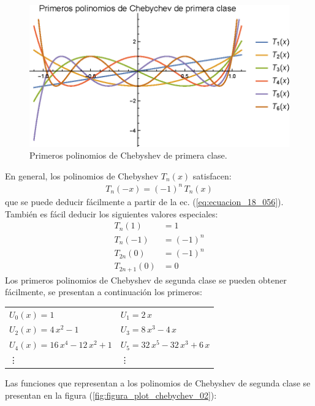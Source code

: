 \begin{figure}[H]
    \centering
    \includegraphics[scale=1.2]{Imagenes/Plot_Polinomios_Chebychev_01.eps}
    \caption{Primeros polinomios de Chebyshev de primera clase.}
    \label{fig:figura_plot_chebychev_01}
\end{figure}
En general, los polinomios de Chebyshev $T_{n}(x)$ satisfacen:
\begin{align*}
T_{n}(-x) = (-1)^{n} \, T_{n} (x)
\end{align*}
que se puede deducir fácilmente a partir de la ec. (\ref{eq:ecuacion_18_056}). También es fácil deducir los siguientes valores especiales:
\begin{align*}
T_{n} (1) &= 1 \\[0.5em]
T_{n} (-1) &= (-1)^{n} \\[0.5em]
T_{2n} (0) &= (-1)^{n} \\[0.5em]
T_{2n+1} (0) &= 0
\end{align*}
Los primeros polinomios de Chebyshev de segunda clase se pueden obtener fácilmente, se presentan a continuación los primeros:
\begin{table}[H]
\centering
\fontsize{14}{14}\selectfont
\begin{tabular}{p{6cm} p{6cm}}
$U_{0}(x) = 1$ & $U_{1} = 2 \, x$ \\[0.5em]
$U_{2}(x) = 4 \, x^{2} - 1$ & $U_{3} = 8 \, x^{3} - 4 \, x$ \\[0.5em]
$U_{4}(x) = 16 \, x^{4} - 12 \, x^{2} + 1$ & $U_{5} = 32 \, x^{5} - 32 \, x^{3} + 6 \, x$ \\[0.5em]
\vdots & \vdots
\end{tabular}
\end{table}
Las funciones que representan a los polinomios de Chebyshev de segunda clase se presentan en la figura (\ref{fig:figura_plot_chebychev_02}):
